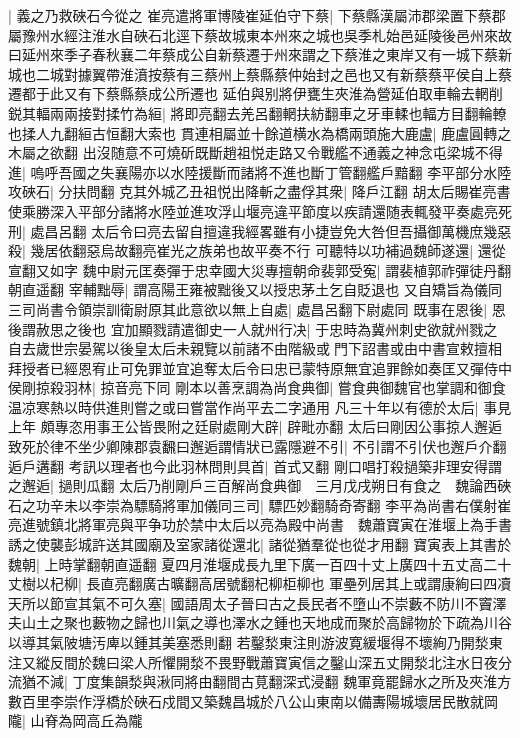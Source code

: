 |{
	義之乃救硤石今從之}
崔亮遣將軍博陵崔延伯守下蔡|{
	下蔡縣漢屬沛郡梁置下蔡郡屬豫州水經注淮水自硤石北逕下蔡故城東本州來之城也吳季札始邑延陵後邑州來故曰延州來季子春秋襄二年蔡成公自新蔡遷于州來謂之下蔡淮之東岸又有一城下蔡新城也二城對據翼帶淮濆按蔡有三蔡州上蔡縣蔡仲始封之邑也又有新蔡蔡平侯自上蔡遷都于此又有下蔡縣蔡成公所遷也}
延伯與别將伊甕生夾淮為營延伯取車輪去輞削鋭其輻兩兩接對揉竹為絙|{
	將即亮翻去羌呂翻輞扶紡翻車之牙車輮也輻方目翻輪轑也揉人九翻絙古恒翻大索也}
貫連相屬並十餘道横水為橋兩頭施大鹿盧|{
	鹿盧圓轉之木屬之欲翻}
出沒随意不可燒斫既斷趙祖悦走路又令戰艦不通義之神念屯梁城不得進|{
	嗚呼吾國之失襄陽亦以水陸援斷而諸將不進也斷丁管翻艦戶黯翻}
李平部分水陸攻硤石|{
	分扶問翻}
克其外城乙丑祖悦出降斬之盡俘其衆|{
	降戶江翻}
胡太后賜崔亮書使乘勝深入平部分諸將水陸並進攻浮山堰亮違平節度以疾請還随表輒發平奏處亮死刑|{
	處昌呂翻}
太后令曰亮去留自擅違我經畧雖有小捷豈免大咎但吾攝御萬機庶幾惡殺|{
	幾居依翻惡烏故翻亮崔光之族弟也故平奏不行}
可聽特以功補過魏師遂還|{
	還從宣翻又如字}
魏中尉元匡奏彈于忠幸國大災專擅朝命裴郭受寃|{
	謂裴植郭祚彈徒丹翻朝直遥翻}
宰輔黜辱|{
	謂高陽王雍被黜後又以授忠茅土乞自貶退也}
又自矯旨為儀同三司尚書令領崇訓衛尉原其此意欲以無上自處|{
	處昌呂翻下尉處同}
既事在恩後|{
	恩後謂赦思之後也}
宜加顯戮請遣御史一人就州行决|{
	于忠時為冀州刺史欲就州戮之}
自去歲世宗晏駕以後皇太后未親覽以前諸不由階級或門下詔書或由中書宣敕擅相拜授者已經恩宥止可免罪並宜追奪太后令曰忠已蒙特原無宜追罪餘如奏匡又彈侍中侯剛掠殺羽林|{
	掠音亮下同}
剛本以善烹調為尚食典御|{
	嘗食典御魏官也掌調和御食温凉寒熱以時供進則嘗之或曰嘗當作尚平去二字通用}
凡三十年以有德於太后|{
	事見上年}
頗專恣用事王公皆畏附之廷尉處剛大辟|{
	辟毗亦翻}
太后曰剛因公事掠人邂逅致死於律不坐少卿陳郡袁飜曰邂逅謂情狀已露隱避不引|{
	不引謂不引伏也邂戶介翻逅戶遘翻}
考訊以理者也今此羽林問則具首|{
	首式又翻}
剛口唱打殺撾築非理安得謂之邂逅|{
	撾則瓜翻}
太后乃削剛戶三百解尚食典御　三月戊戌朔日有食之　魏論西硤石之功辛未以李崇為驃騎將軍加儀同三司|{
	驃匹妙翻騎奇寄翻}
李平為尚書右僕射崔亮進號鎮北將軍亮與平争功於禁中太后以亮為殿中尚書　魏蕭寶寅在淮堰上為手書誘之使襲彭城許送其國廟及室家諸從還北|{
	諸從猶羣從也從才用翻}
寶寅表上其書於魏朝|{
	上時掌翻朝直遥翻}
夏四月淮堰成長九里下廣一百四十丈上廣四十五丈高二十丈樹以杞柳|{
	長直亮翻廣古曠翻高居號翻杞柳柜柳也}
軍壘列居其上或謂康絢曰四凟天所以節宣其氣不可久塞|{
	國語周太子晉曰古之長民者不墮山不崇藪不防川不竇澤夫山土之聚也藪物之歸也川氣之導也澤水之鍾也天地成而聚於高歸物於下疏為川谷以導其氣陂塘汚庳以鍾其美塞悉則翻}
若鑿湬東注則游波寛緩堰得不壞絢乃開湬東注又縱反間於魏曰梁人所懼開湬不畏野戰蕭寶寅信之鑿山深五丈開湬北注水日夜分流猶不減|{
	丁度集韻湬與湫同將由翻間古莧翻深式浸翻}
魏軍竟罷歸水之所及夾淮方數百里李崇作浮橋於硤石戍間又築魏昌城於八公山東南以備夀陽城壞居民散就岡隴|{
	山脊為岡高丘為隴}

